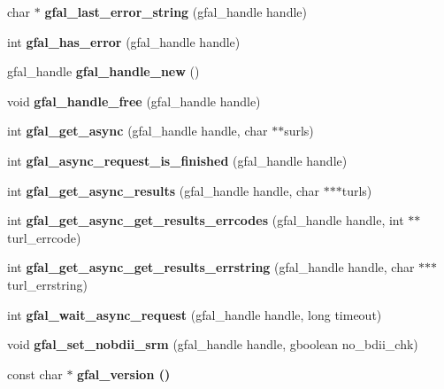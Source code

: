 \begin{CompactItemize}
\item 
char $\ast$ \textbf{gfal\_\-last\_\-error\_\-string} (gfal\_\-handle handle)\label{gfal__common__interface_8h_bdebd69c0c6a74b1b5adf88b5e836d8a}

\item 
int \textbf{gfal\_\-has\_\-error} (gfal\_\-handle handle)\label{gfal__common__interface_8h_ad28f1c5d1a0ed623834e6133bb7dd2e}

\item 
gfal\_\-handle \textbf{gfal\_\-handle\_\-new} ()\label{gfal__common__interface_8h_4211faf02a3c5cc696c7c9f974415d11}

\item 
void \textbf{gfal\_\-handle\_\-free} (gfal\_\-handle handle)\label{gfal__common__interface_8h_0071cb3665f7dca9648fa46bebeca524}

\item 
int \textbf{gfal\_\-get\_\-async} (gfal\_\-handle handle, char $\ast$$\ast$surls)\label{gfal__common__interface_8h_68ef05f37b4971c8306b1cc6ee529647}

\item 
int \textbf{gfal\_\-async\_\-request\_\-is\_\-finished} (gfal\_\-handle handle)\label{gfal__common__interface_8h_ce6fcac8e92ad2e1d699eed2ce74a257}

\item 
int \textbf{gfal\_\-get\_\-async\_\-results} (gfal\_\-handle handle, char $\ast$$\ast$$\ast$turls)\label{gfal__common__interface_8h_0c654545b837b8e1928842ee762ce5e9}

\item 
int \textbf{gfal\_\-get\_\-async\_\-get\_\-results\_\-errcodes} (gfal\_\-handle handle, int $\ast$$\ast$turl\_\-errcode)\label{gfal__common__interface_8h_a3161f12f9d5c8151f44df4f132602cb}

\item 
int \textbf{gfal\_\-get\_\-async\_\-get\_\-results\_\-errstring} (gfal\_\-handle handle, char $\ast$$\ast$$\ast$turl\_\-errstring)\label{gfal__common__interface_8h_ecd7d68b18088ff620d21dbef85862ae}

\item 
int \textbf{gfal\_\-wait\_\-async\_\-request} (gfal\_\-handle handle, long timeout)\label{gfal__common__interface_8h_08c8573e050334d5342a31a48b7db4cb}

\item 
void \textbf{gfal\_\-set\_\-nobdii\_\-srm} (gfal\_\-handle handle, gboolean no\_\-bdii\_\-chk)\label{gfal__common__interface_8h_5e3afd0690b23dedf14d6fa7898f28a9}

\item 
const char $\ast$ \bf{gfal\_\-version} ()
\end{CompactItemize}


